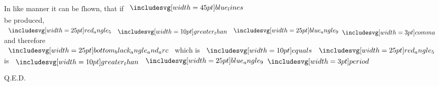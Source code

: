 \documentclass[12pt,preview]{standalone}
\begin{document}
\begin{minipage}[t]{0.64\textwidth}
    \hfill

    \begin{center}
        In like manner it can be ſhown, that if $\bimg{blue_lines}$\\
        be produced, $\img{red_angle_5} \bgt \img{blue_angle_9} \bcomma$ and therefore\\
        $\img{bottom_black_angle_and_arc}$ which is $\bequals \img{red_angle_5}$ is $\bgt \img{blue_angle_9} \bperiod$
    \end{center}

    \hfill

    \hfill Q.E.D.
\end{minipage}
\end{document}
